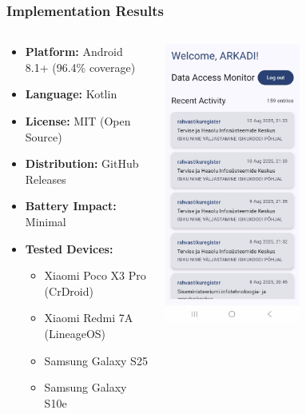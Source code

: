 \documentclass[aspectratio=169,11pt]{beamer}
\begin{document}
\begin{frame}
\frametitle{Implementation Results}
\begin{columns}
\begin{column}{0.6\textwidth}
\begin{itemize}
    \item \textbf{Platform:} Android 8.1+ (96.4\% coverage)
    \item \textbf{Language:} Kotlin
    \item \textbf{License:} MIT (Open Source)
    \item \textbf{Distribution:} GitHub Releases
    \item \textbf{Battery Impact:} Minimal
    \item \textbf{Tested Devices:}
    \begin{itemize}
        \item Xiaomi Poco X3 Pro (CrDroid)
        \item Xiaomi Redmi 7A (LineageOS)  
        \item Samsung Galaxy S25
        \item Samsung Galaxy S10e
    \end{itemize}
\end{itemize}
\end{column}
\begin{column}{0.4\textwidth}

\begin{center}

\includegraphics[width=0.55\textwidth]{../english/figures/Screenshot_20250812_212336_Data Access Notifier.jpg}
\end{center}
\end{column}
\end{columns}
\end{frame}
\end{document}

